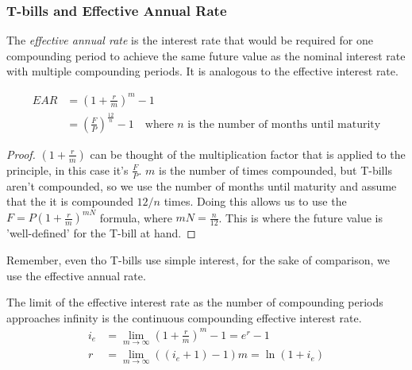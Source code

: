 \subsubsection{T-bills and Effective Annual Rate}

\begin{definition}
    The \textit{effective annual rate} is the interest rate that would be required for one compounding period to achieve the same future value as the nominal interest rate with multiple compounding periods. It is analogous to the effective interest rate.
\end{definition}

\begin{theorem}
    \begin{align*}
        EAR & = (1 + \frac{r}{m})^m - 1 \\
        & = (\frac{F}{P})^{\frac{12}{n}} - 1 \quad \text{where $n$ is the number of months until maturity}
    \end{align*}
\end{theorem}
\begin{proof}
    $(1 + \frac{r}{m})$ can be thought of the multiplication factor that is applied to the principle, in this case it's $\frac{F}{P}$. $m$ is the number of times compounded, but T-bills aren't compounded, so we use the number of months until maturity and assume that the it is compounded $12/n$ times. Doing this allows us to use the $F = P(1 + \frac{r}{m})^{mN}$ formula, where $mN = \frac{n}{12}$. This is where the future value is 'well-defined' for the T-bill at hand.
\end{proof}

\begin{remark}
    Remember, even tho T-bills use simple interest, for the sake of comparison, we use the effective annual rate.
\end{remark}

\begin{corollary}
    The limit of the effective interest rate as the number of compounding periods approaches infinity is the continuous compounding effective interest rate.
    \begin{align}
        i_e & = \lim_{m \to \infty} (1 + \frac{r}{m})^m - 1 = e^r - 1 \\
        r   & = \lim_{m \to \infty} ((i_e + 1) - 1)m = \ln(1 + i_e)
    \end{align}
\end{corollary}

